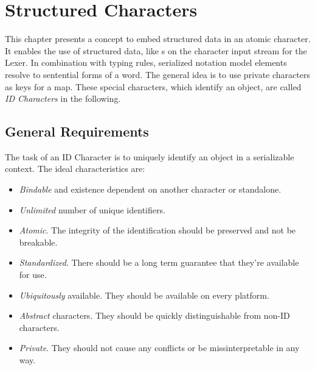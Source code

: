 \section{Structured Characters}
This chapter presents a concept to embed structured data in an atomic character. It enables the use of structured data, like s on the character input stream for the Lexer. In combination with typing rules, serialized notation model elements resolve to sentential forms of a word. The general idea is to use private characters as keys for a map. These special characters, which identify an object, are called \emph{ID Characters} in the following.

\subsection{General Requirements}
The task of an ID Character is to uniquely identify an object in a serializable context. 
The ideal characteristics are:
\begin{itemize}
	\item \emph{Bindable} and existence dependent on another character or standalone.
	\item \emph{Unlimited} number of unique identifiers.
	\item \emph{Atomic}. The integrity of the identification should be preserved and not be breakable.
	\item \emph{Standardized}. There should be a long term guarantee that they're available for use.
	\item \emph{Ubiquitously} available. They should be available on every platform.
	\item \emph{Abstract} characters. They should be quickly distinguishable from non-ID characters.
	\item \emph{Private}. They should not cause any conflicts or be missinterpretable in any way.
\end{itemize}

